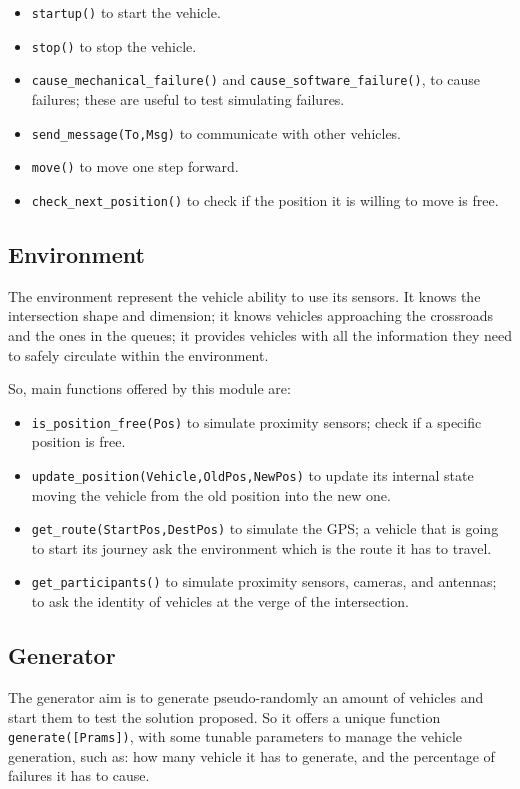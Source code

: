 \documentclass{memoir}
\begin{document}
\begin{itemize}
	\item \texttt{startup()} to start the vehicle.
	\item \texttt{stop()} to stop the vehicle.
	\item \texttt{cause\_mechanical\_failure()} and \texttt{cause\_software\_failure()}, to cause failures; these are useful to test simulating failures.
	\item \texttt{send\_message(To,Msg)} to communicate with other vehicles.
	\item \texttt{move()} to move one step forward.
	\item \texttt{check\_next\_position()} to check if the position it is willing to move is free.
\end{itemize}


\subsection{Environment}
The environment represent the vehicle ability to use its sensors. It knows the intersection shape and dimension; it knows vehicles approaching the crossroads and the ones in the queues; it provides vehicles with all the information they need to safely circulate within the environment.

So, main functions offered by this module are:

\begin{itemize}
	\item \texttt{is\_position\_free(Pos)} to simulate proximity sensors; check if a specific position is free.
	\item \texttt{update\_position(Vehicle,OldPos,NewPos)} to update its internal state moving the vehicle from the old position into the new one.
	\item \texttt{get\_route(StartPos,DestPos)} to simulate the GPS; a vehicle that is going to start its journey ask the environment which is the route it has to travel.
	\item \texttt{get\_participants()} to simulate proximity sensors, cameras, and antennas; to ask the identity of vehicles at the verge of the intersection. 
\end{itemize}

\subsection{Generator}
The generator aim is to generate pseudo-randomly an amount of vehicles and start them to test the solution proposed. So it offers a unique function \verb|generate([Prams])|, with some tunable parameters to manage the vehicle generation, such as: how many vehicle it has to generate, and the percentage of failures it has to cause.
\end{document}
